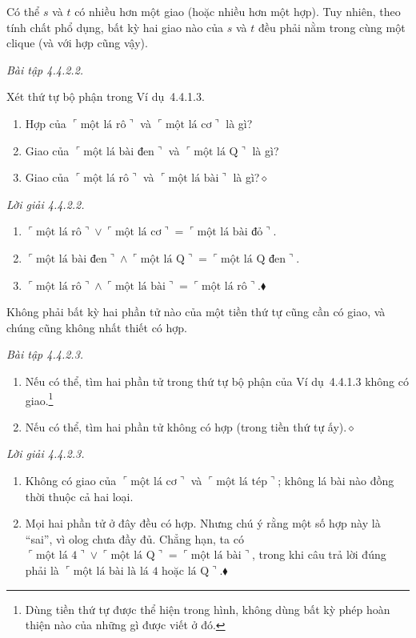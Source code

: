 Có thể $s$ và $t$ có nhiều hơn một giao (hoặc nhiều hơn một hợp). Tuy nhiên, theo tính chất phổ dụng, bất kỳ hai giao nào của $s$ và $t$ đều phải nằm trong cùng một clique (và với hợp cũng vậy).

\noindent\textit{Bài tập 4.4.2.2.}\keepwithnext

Xét thứ tự bộ phận trong Ví dụ~4.4.1.3.
\begin{enumerate}[label=\alph*.]
\item Hợp của $\ulcorner\text{một lá rô}\urcorner$ và $\ulcorner\text{một lá cơ}\urcorner$ là gì?
\item Giao của $\ulcorner\text{một lá bài đen}\urcorner$ và $\ulcorner\text{một lá Q}\urcorner$ là gì?
\item Giao của $\ulcorner\text{một lá rô}\urcorner$ và $\ulcorner\text{một lá bài}\urcorner$ là gì?\nobreak\hfill$\diamond$
\end{enumerate}

\noindent\textit{Lời giải 4.4.2.2.}\keepwithnext
\begin{enumerate}[label=\alph*.]
\item $\ulcorner\text{một lá rô}\urcorner\vee\ulcorner\text{một lá cơ}\urcorner=\ulcorner\text{một lá bài đỏ}\urcorner$.
\item $\ulcorner\text{một lá bài đen}\urcorner\wedge\ulcorner\text{một lá Q}\urcorner=\ulcorner\text{một lá Q đen}\urcorner$.
\item $\ulcorner\text{một lá rô}\urcorner\wedge\ulcorner\text{một lá bài}\urcorner=\ulcorner\text{một lá rô}\urcorner$.\nobreak\hfill$\blacklozenge$
\end{enumerate}

Không phải bất kỳ hai phần tử nào của một tiền thứ tự cũng cần có giao, và chúng cũng không nhất thiết có hợp.

\noindent\textit{Bài tập 4.4.2.3.}\keepwithnext
\begin{enumerate}[label=\alph*.]
\item Nếu có thể, tìm hai phần tử trong thứ tự bộ phận của Ví dụ~4.4.1.3 không có giao.\footnote{Dùng tiền thứ tự được thể hiện trong hình, không dùng bất kỳ phép hoàn thiện nào của những gì được viết ở đó.}
\item Nếu có thể, tìm hai phần tử không có hợp (trong tiền thứ tự ấy).\nobreak\hfill$\diamond$
\end{enumerate}

\noindent\textit{Lời giải 4.4.2.3.}\keepwithnext
\begin{enumerate}[label=\alph*.]
\item Không có giao của $\ulcorner\text{một lá cơ}\urcorner$ và $\ulcorner\text{một lá tép}\urcorner$; không lá bài nào đồng thời thuộc cả hai loại.
\item Mọi hai phần tử ở đây đều có hợp. Nhưng chú ý rằng một số hợp này là ``sai'', vì olog chưa đầy đủ. Chẳng hạn, ta có $\ulcorner\text{một lá 4}\urcorner\vee\ulcorner\text{một lá Q}\urcorner=\ulcorner\text{một lá bài}\urcorner$, trong khi câu trả lời đúng phải là $\ulcorner\text{một lá bài là lá 4 hoặc lá Q}\urcorner$.\nobreak\hfill$\blacklozenge$
\end{enumerate}

